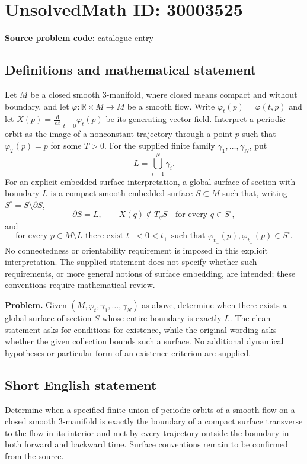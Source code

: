 \documentclass[11pt]{article}
\newcommand{\R}{\mathbb{R}}
\newcommand{\dd}{\,\mathrm{d}}
\begin{document}
\section*{UnsolvedMath ID: 30003525}
\textbf{Source problem code:} catalogue entry
\subsection{Definitions and mathematical statement}
Let \(M\) be a closed smooth \(3\)-manifold, where closed means compact and without boundary, and let \(\varphi:\R\times M\to M\) be a smooth flow. Write \(\varphi_t(p)=\varphi(t,p)\) and let \(X(p)=\left.\frac{\dd}{\dd t}\right|_{t=0}\varphi_t(p)\) be its generating vector field. Interpret a periodic orbit as the image of a nonconstant trajectory through a point \(p\) such that \(\varphi_T(p)=p\) for some \(T>0\). For the supplied finite family \(\gamma_1,\ldots,\gamma_N\), put
\[
L=\bigcup_{i=1}^{N}\gamma_i.
\]
For an explicit embedded-surface interpretation, a global surface of section with boundary \(L\) is a compact smooth embedded surface \(S\subset M\) such that, writing \(S^\circ=S\setminus\partial S\),
\[
\partial S=L,\qquad X(q)\notin T_qS\quad\text{for every }q\in S^\circ,
\]
and
\[
\text{for every }p\in M\setminus L\text{ there exist }t_-<0<t_+\text{ such that }
\varphi_{t_-}(p),\varphi_{t_+}(p)\in S^\circ.
\]
No connectedness or orientability requirement is imposed in this explicit interpretation. The supplied statement does not specify whether such requirements, or more general notions of surface embedding, are intended; these conventions require mathematical review.

\textbf{Problem.} Given \((M,\varphi_t,\gamma_1,\ldots,\gamma_N)\) as above, determine when there exists a global surface of section \(S\) whose entire boundary is exactly \(L\). The clean statement asks for conditions for existence, while the original wording asks whether the given collection bounds such a surface. No additional dynamical hypotheses or particular form of an existence criterion are supplied.
\subsection{Short English statement}
Determine when a specified finite union of periodic orbits of a smooth flow on a closed smooth \(3\)-manifold is exactly the boundary of a compact surface transverse to the flow in its interior and met by every trajectory outside the boundary in both forward and backward time. Surface conventions remain to be confirmed from the source.
\end{document}
